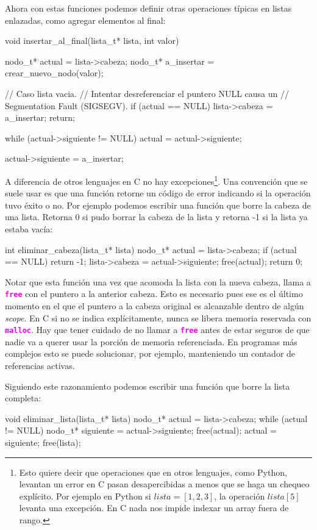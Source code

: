 \documentclass[]{scrartcl}
\newcommand{\hl}[1]{\textcolor{magenta}{\textbf{\texttt{#1}}}}
\begin{document}
Ahora con estas funciones podemos definir otras operaciones típicas en listas enlazadas, como agregar elementos al final:

\begin{cbox}[unbreakable]{}
void insertar_al_final(lista_t* lista, int valor) {
    nodo_t* actual = lista->cabeza;
    nodo_t* a_insertar = crear_nuevo_nodo(valor);

    // Caso lista vacia. 
    // Intentar desreferenciar el puntero NULL causa un 
    // Segmentation Fault (SIGSEGV).
    if (actual == NULL) {
        lista->cabeza = a_insertar;
        return;
    }

    while (actual->siguiente != NULL)
        actual = actual->siguiente;

    actual->siguiente = a_insertar;
}
\end{cbox}

A diferencia de otros lenguajes en C no hay excepciones\footnote{Esto quiere decir que operaciones que en otros lenguajes, como Python, levantan un error en C pasan desapercibidas a menos que se haga un chequeo explícito. Por ejemplo en Python si $lista = [1,2,3]$, la operación $lista[5]$ levanta una excepción. En C nada nos impide indexar un array fuera de rango.}. Una convención que se suele usar es que una función retorne un código de error indicando si la operación tuvo éxito o no. Por ejemplo podemos escribir una función que borre la cabeza de una lista. Retorna 0 si pudo borrar la cabeza de la lista y retorna -1 si la lista ya estaba vacía:

\begin{cbox}[unbreakable]{}
int eliminar_cabeza(lista_t* lista) {
    nodo_t* actual = lista->cabeza;
    if (actual == NULL)
        return -1;
    lista->cabeza = actual->siguiente;
    free(actual);
    return 0;
}
\end{cbox}

Notar que esta función una vez que acomoda la lista con la nueva cabeza, llama a \hl{free} con el puntero a la anterior cabeza. Esto es necesario pues ese es el último momento en el que el puntero a la cabeza original es alcanzable dentro de algún \textit{scope}. En C si no se indica explícitamente, nunca se libera memoria reservada con \hl{malloc}. Hay que tener cuidado de no llamar a \hl{free} antes de estar seguros de que nadie va a querer usar la porción de memoria referenciada. En programas más complejos esto se puede solucionar, por ejemplo, manteniendo un contador de referencias activas.

Siguiendo este razonamiento podemos escribir una función que borre la lista completa:
\begin{cbox}[unbreakable]{}
void eliminar_lista(lista_t* lista) {
    nodo_t* actual = lista->cabeza;
    while (actual != NULL) {
        nodo_t* siguiente = actual->siguiente;
        free(actual);
        actual = siguiente;
    }
    free(lista);
}
\end{cbox}
\end{document}
